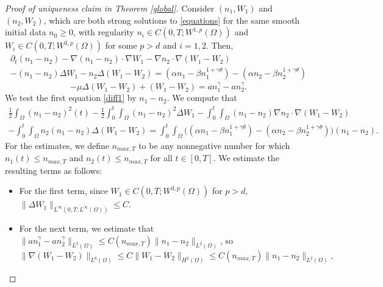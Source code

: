 \documentclass[12pt]{article}
\theoremstyle{plain}
\begin{document}
\begin{proof}[Proof of uniqueness claim in Theorem \ref{global}]
Consider $(n_{1}, W_{1})$ and $(n_{2}, W_{2})$, which are both strong solutions to \eqref{equations} for the same smooth initial data $n_{0} \ge 0$, with regularity $n_{i} \in C(0, T; W^{1, p}(\Omega))$ and $W_{i} \in C(0, T; W^{3, p}(\Omega))$ for some $p > d$ and $i = 1, 2$. Then,
\begin{multline}\label{diff1}
\partial_{t}(n_{1} - n_{2}) - \nabla (n_{1} - n_{2}) \cdot \nabla W_{1} - \nabla n_{2} \cdot \nabla (W_{1} - W_{2}) \\
- (n_{1} - n_{2}) \Delta W_{1} - n_{2} \Delta (W_{1} - W_{2}) = (\alpha n_{1} - \beta n_{1}^{1 + \gamma \theta}) - (\alpha n_{2} - \beta n_{2}^{1 + \gamma \theta})
\end{multline}
\begin{equation}\label{diff2}
-\mu \Delta (W_{1} - W_{2}) + (W_{1} - W_{2}) = an_{1}^{\gamma} - an_{2}^{\gamma}.
\end{equation}
We test the first equation \eqref{diff1} by $n_{1} - n_{2}$. We compute that
\begin{multline}\label{diff1result}
\frac{1}{2} \int_{\Omega} (n_{1} - n_{2})^{2}(t) - \frac{1}{2} \int_{0}^{t} \int_{\Omega} (n_{1} - n_{2})^{2} \Delta W_{1} - \int_{0}^{t} \int_{\Omega} (n_{1} - n_{2}) \nabla n_{2} \cdot \nabla (W_{1} - W_{2}) \\
- \int_{0}^{t} \int_{\Omega} n_{2}(n_{1} - n_{2})\Delta (W_{1} - W_{2}) = \int_{0}^{t} \int_{\Omega} \Big((\alpha n_{1} - \beta n_{1}^{1 + \gamma \theta}) - (\alpha n_{2} - \beta n_{2}^{1 + \gamma \theta})\Big) (n_{1} - n_{2}).
\end{multline}
For the estimates, we define $n_{max, T}$ to be any nonnegative number for which $n_{1}(t) \le n_{max, T}$ and $n_{2}(t) \le n_{max, T}$ for all $t \in [0, T]$. We estimate the resulting terms as follows:
\begin{itemize}
\item For the first term, since $W_{1} \in C(0, T; W^{3, p}(\Omega))$ for $p > d$, $\|\Delta W_{1}\|_{L^{\infty}(0, T; L^{\infty}(\Omega))} \le C$.
\item For the next term, we estimate that $\|an_{1}^{\gamma} - an_{2}^{\gamma}\|_{L^{2}(\Omega)} \le C(n_{max, T})\|n_{1} - n_{2}\|_{L^{2}(\Omega)}$, so
\begin{equation*}
\|\nabla (W_{1} - W_{2})\|_{L^{6}(\Omega)} \le C\|W_{1} - W_{2}\|_{H^{2}(\Omega)} \le C(n_{max, T})\|n_{1} - n_{2}\|_{L^{2}(\Omega)},
\end{equation*}

\end{itemize}
\end{proof}
\end{document}

